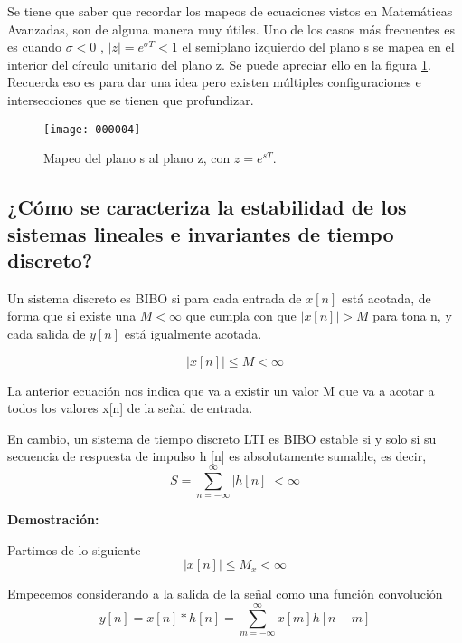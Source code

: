 Se tiene que saber que recordar los mapeos de ecuaciones vistos en Matemáticas Avanzadas, son de alguna manera muy útiles. Uno de los casos más frecuentes es es cuando $\sigma <0$ , $ |z|=e^{\sigma T}<1$ el semiplano izquierdo del plano s se mapea en el interior del círculo unitario
del plano z. Se puede apreciar ello en la figura \ref{fig:000004}. Recuerda eso es para dar una idea pero existen múltiples configuraciones e intersecciones que se tienen que profundizar.


\begin{figure}[H]
	\centering
	\texttt{[image: 000004]}
	\caption{Mapeo del plano s al plano z, con $z=e^{sT}$.}
	\label{fig:000004}
\end{figure}

\subsection{¿Cómo se caracteriza la estabilidad de los sistemas lineales e invariantes de tiempo discreto?}

	
	Un sistema discreto es BIBO si para cada entrada de $x[n]$ está acotada, de forma que si existe una $M<\infty$ que cumpla con que $|x[n]|>M$ para tona n, y cada salida de $y[n]$ está igualmente acotada.
	
	\begin{equation}
	|x[n]| \leq M < \infty
	\end{equation}
	
	La anterior ecuación nos indica que va a existir un valor M que va a acotar a todos los valores x[n] de la señal de entrada.
	
	En cambio, un sistema de tiempo discreto LTI es BIBO estable si y solo si su secuencia de respuesta de impulso {h [n]} es absolutamente sumable, es decir,
	\begin{equation}
		S=\sum_{n=-\infty}^{\infty}|h[n]|<\infty
	\end{equation}
	
	\noindent\textbf{Demostración:}

	Partimos de lo siguiente
	\begin{equation}
		|x[n]| \leq M_x < \infty
	\end{equation}		
	
	Empecemos considerando a la salida de la señal como una función convolución
	\begin{equation}
		y[n]=x[n]*h[n]=\sum_{m=-\infty}^{\infty}x[m]h[n-m]
	\end{equation}
	
